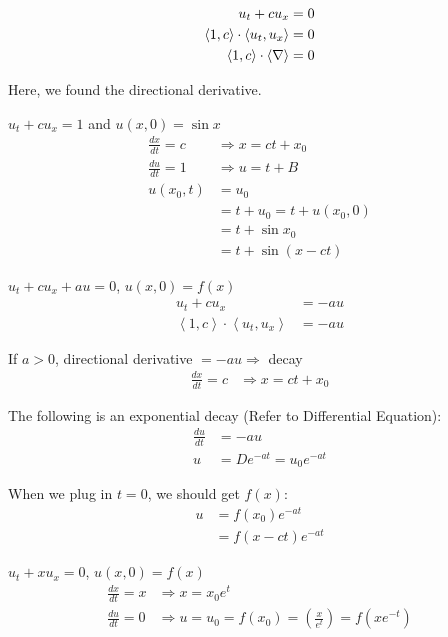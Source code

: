 \documentclass{article}
\begin{document}
\note
%
\begin{align}
  u_t + cu_x & = 0\\
  \left< 1, c \right> \cdot \left< u_t, u_x \right> & = 0\\
  \left< 1, c \right> \cdot \left< \nabla \right> & = 0
\end{align}

Here, we found the directional derivative.

\ex $u_t + cu_x = 1$ and $u(x, 0) = \sin x$
%
\begin{align}
  \frac{dx}{dt} = c & \Rightarrow x = ct + x_0\\
  \frac{du}{dt} = 1 & \Rightarrow u = t + B\\
  u(x_0, t) & = u_0\\
  & = t + u_0 = t + u(x_0, 0)\\
  & = t + \sin x_0\\
  & = t + \sin(x - ct)
\end{align}

\ex $u_t + cu_x + au = 0$, $u(x, 0) = f(x)$
%
\begin{align}
  u_t + cu_x & = -au\\
  \left< 1, c \right> \cdot \left< u_t, u_x \right> & = -au
\end{align}

If $a > 0$, directional derivative $= -au \Rightarrow$ decay
%
\begin{align}
  \frac{dx}{dt} = c & \Rightarrow x = ct + x_0
\end{align}

The following is an exponential decay (Refer to Differential Equation):
%
\begin{align}
  \frac{du}{dt} & = -au\\
  u & = De^{-at} = u_0 e^{-at}
\end{align}

When we plug in $t = 0$, we should get $f(x)$:
%
\begin{align}
  u & = f(x_0) e^{-at}\\
  & = f(x - ct) e^{-at}
\end{align}

\ex $u_t + xu_x = 0$, $u(x, 0) = f(x)$
%
\begin{align}
  \frac{dx}{dt} = x & \Rightarrow x = x_0 e^t\\
  \frac{du}{dt} = 0 & \Rightarrow u = u_0 = f(x_0) = \left(\frac{x}{e^t}\right) = f(xe^{-t})
\end{align}
\end{document}
